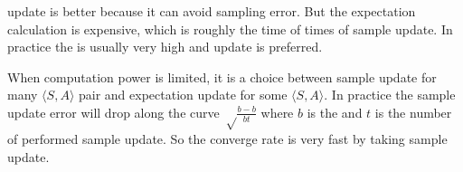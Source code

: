  update is better because it can avoid sampling error. But the expectation calculation is expensive, which is roughly the time of  times of sample update. In practice the  is usually very high and  update is preferred.

When computation power is limited, it is a choice between  sample update for many $\langle S,A \rangle$ pair and expectation update for some  $\langle S,A \rangle$. In practice the sample update error will drop along the curve $\sqrt \frac{b-b}{bt}$ where $b$ is the  and $t$ is the number of performed sample update. So the converge rate is very fast by taking sample update.




